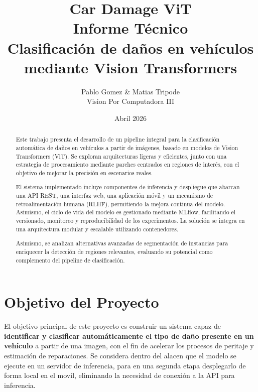 \documentclass[12pt,a4paper]{article}
\title{
  \vspace{1cm}
  {\LARGE \textbf{Car Damage ViT}} \\[0.5em]
  {\large Informe Técnico} \\[1em]
  {\normalsize Clasificación de daños en vehículos mediante Vision Transformers}
  \vspace{0.5cm}
}
\author{
  Pablo Gomez \quad \& \quad Matias Tripode \\[0.3em]
  \small Vision Por Computadora III
}
\date{Abril 2026}
\begin{document}

\maketitle
\thispagestyle{empty}
\vspace{1cm}

\begin{abstract}
Este trabajo presenta el desarrollo de un pipeline integral para la clasificación automática de daños en vehículos a partir de imágenes, basado en modelos de Vision Transformers (ViT). Se exploran arquitecturas ligeras y eficientes, junto con una estrategia de procesamiento mediante parches centrados en regiones de interés, con el objetivo de mejorar la precisión en escenarios reales.

El sistema implementado incluye componentes de inferencia y despliegue que abarcan una API REST, una interfaz web, una aplicación móvil y un mecanismo de retroalimentación humana (RLHF), permitiendo la mejora continua del modelo. Asimismo, el ciclo de vida del modelo es gestionado mediante MLflow, facilitando el versionado, monitoreo y reproducibilidad de los experimentos. La solución se integra en una arquitectura modular y escalable utilizando contenedores.

Asimismo, se analizan alternativas avanzadas de segmentación de instancias para enriquecer la detección de regiones relevantes, evaluando su potencial como complemento del pipeline de clasificación.
\end{abstract}

\newpage
\tableofcontents
\newpage

\section{Objetivo del Proyecto}

El objetivo principal de este proyecto es construir un sistema capaz de \textbf{identificar
y clasificar automáticamente el tipo de daño presente en un vehículo} a partir de una
imagen, con el fin de acelerar los procesos de peritaje y estimación de reparaciones. Se considera dentro del alacen que el modelo se ejecute en un servidor de inferencia, para en una segunda etapa desplegarlo de forma local en el movil, eliminando la necesidad de conexión a la API para inferencia.
\end{document}

